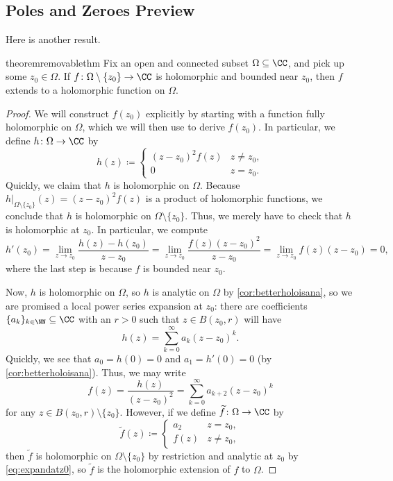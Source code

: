 \subsection{Poles and Zeroes Preview}
Here is another result.
\begin{restatable}{theorem}{removablethm} \label{thm:riemannremove}
	Fix an open and connected subset $\Omega\subseteq\CC$, and pick up some $z_0\in\Omega$. If $f\colon \Omega\setminus\{z_0\}\to\CC$ is holomorphic and bounded near $z_0$, then $f$ extends to a holomorphic function on $\Omega$.
\end{restatable}
\begin{proof}
	We will construct $f(z_0)$ explicitly by starting with a function fully holomorphic on $\Omega$, which we will then use to derive $f(z_0)$. In particular, we define $h\colon \Omega\to\CC$ by
	\[h(z)\coloneqq \begin{cases}
		(z-z_0)^2f(z) & z\ne z_0, \\
		0 & z=z_0.
	\end{cases}\]
	Quickly, we claim that $h$ is holomorphic on $\Omega$. Because $h|_{\Omega\setminus\{z_0\}}(z)=(z-z_0)^2f(z)$ is a product of holomorphic functions, we conclude that $h$ is holomorphic on $\Omega\setminus\{z_0\}$. Thus, we merely have to check that $h$ is holomorphic at $z_0$. In particular, we compute
	\[h'(z_0)=\lim_{z\to z_0}\frac{h(z)-h(z_0)}{z-z_0}=\lim_{z\to z_0}\frac{f(z)(z-z_0)^2}{z-z_0}=\lim_{z\to z_0}f(z)(z-z_0)=0,\]
	where the last step is because $f$ is bounded near $z_0$.

	Now, $h$ is holomorphic on $\Omega$, so $h$ is analytic on $\Omega$ by \autoref{cor:betterholoisana}, so we are promised a local power series expansion at $z_0$: there are coefficients $\{a_k\}_{k\in\NN}\subseteq\CC$ with an $r>0$ such that $z\in B(z_0,r)$ will have
	\[h(z)=\sum_{k=0}^\infty a_k(z-z_0)^k.\]
	Quickly, we see that $a_0=h(0)=0$ and $a_1=h'(0)=0$ (by \autoref{cor:betterholoisana}). Thus, we may write
	\[f(z)=\frac{h(z)}{(z-z_0)^2}=\sum_{k=0}^\infty a_{k+2}(z-z_0)^k\tag{$*$}\label{eq:expandatz0}\]
	for any $z\in B(z_0,r)\setminus\{z_0\}$. However, if we define $\widetilde f\colon \Omega\to\CC$ by
	\[\widetilde f(z)\coloneqq \begin{cases}
		a_2 & z=z_0, \\
		f(z) & z\ne z_0,
	\end{cases}\]
	then $\widetilde f$ is holomorphic on $\Omega\setminus\{z_0\}$ by restriction and analytic at $z_0$ by \autoref{eq:expandatz0}, so $\widetilde f$ is the holomorphic extension of $f$ to $\Omega$.
\end{proof}
